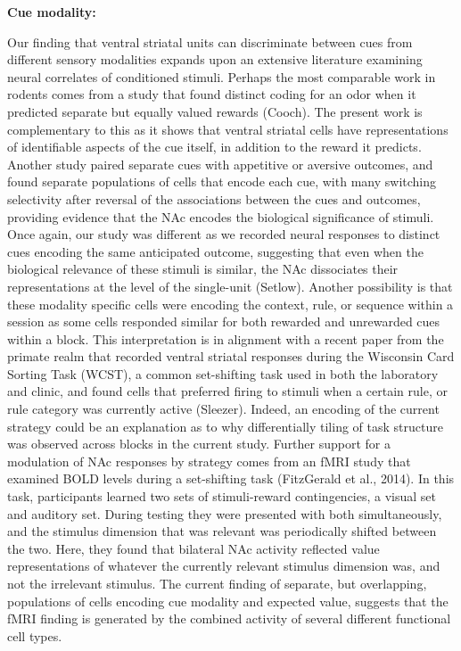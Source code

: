 \documentclass[11pt]{article}
\begin{document}
{\bf Cue modality:}  

Our finding that ventral striatal units can discriminate between cues from different sensory modalities expands upon an extensive literature examining neural correlates of conditioned stimuli. Perhaps the most comparable work in rodents comes from a study that found distinct coding for an odor when it predicted separate but equally valued rewards (Cooch). The present work is complementary to this as it shows that ventral striatal cells have representations of identifiable aspects of the cue itself, in addition to the reward it predicts. Another study paired separate cues with appetitive or aversive outcomes, and found separate populations of cells that encode each cue, with many switching selectivity after reversal of the associations between the cues and outcomes, providing evidence that the NAc encodes the biological significance of stimuli. Once again, our study was different as we recorded neural responses to distinct cues encoding the same anticipated outcome, suggesting that even when the biological relevance of these stimuli is similar, the NAc dissociates their representations at the level of the single-unit (Setlow). Another possibility is that these modality specific cells were encoding the context, rule, or sequence within a session as some cells responded similar for both rewarded and unrewarded cues within a block. This interpretation is in alignment with a recent paper from the primate realm that recorded ventral striatal responses during the Wisconsin Card Sorting Task (WCST), a common set-shifting task used in both the laboratory and clinic, and found cells that preferred firing to stimuli when a certain rule, or rule category was currently active (Sleezer). Indeed, an encoding of the current strategy could be an explanation as to why differentially tiling of task structure was observed across blocks in the current study. Further support for a modulation of NAc responses by strategy comes from an fMRI study that examined BOLD levels during a set-shifting task (FitzGerald et al., 2014). In this task, participants learned two sets of stimuli-reward contingencies, a visual set and auditory set. During testing they were presented with both simultaneously, and the stimulus dimension that was relevant was periodically shifted between the two. Here, they found that bilateral NAc activity reflected value representations of whatever the currently relevant stimulus dimension was, and not the irrelevant stimulus. The current finding of separate, but overlapping, populations of cells encoding cue modality and expected value, suggests that the fMRI finding is generated by the combined activity of several different functional cell types. 
\end{document}
